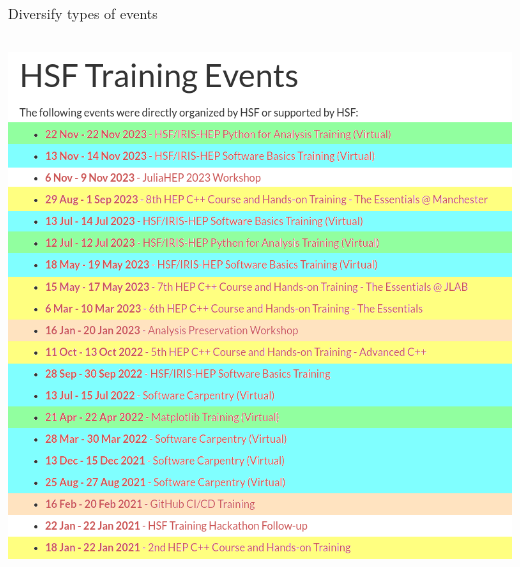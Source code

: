 \documentclass[aspectratio=169]{beamer}
\begin{document}
\begin{frame}{Diversify types of events}
\vspace{0.2 cm}
\begin{columns}[t]
\includegraphics[width=\linewidth]{training-3years.png}


\end{columns}
\end{frame}
\end{document}
